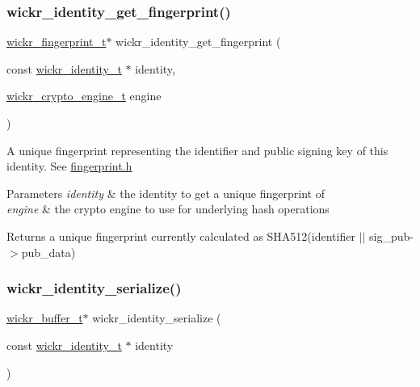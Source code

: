 \subsubsection{\texorpdfstring{wickr\_identity\_get\_fingerprint()}{wickr\_identity\_get\_fingerprint()}}
{\footnotesize\ttfamily \mbox{\hyperlink{structwickr__fingerprint}{wickr\+\_\+fingerprint\+\_\+t}}$\ast$ wickr\+\_\+identity\+\_\+get\+\_\+fingerprint (\begin{DoxyParamCaption}\item[{const \mbox{\hyperlink{structwickr__identity}{wickr\+\_\+identity\+\_\+t}} $\ast$}]{identity,  }\item[{\mbox{\hyperlink{structwickr__crypto__engine}{wickr\+\_\+crypto\+\_\+engine\+\_\+t}}}]{engine }\end{DoxyParamCaption})}

A unique fingerprint representing the identifier and public signing key of this identity. See \textquotesingle{}\mbox{\hyperlink{fingerprint_8h_source}{fingerprint.\+h}}\textquotesingle{}


\begin{DoxyParams}{Parameters}
{\em identity} & the identity to get a unique fingerprint of \\
\hline
{\em engine} & the crypto engine to use for underlying hash operations \\
\hline
\end{DoxyParams}
\begin{DoxyReturn}{Returns}
a unique fingerprint currently calculated as S\+H\+A512(identifier $\vert$$\vert$ sig\+\_\+pub-\/$>$pub\+\_\+data) 
\end{DoxyReturn}
\mbox{\label{group__wickr__identity_ga79ca0713d0b90873e584379f26cbd051}} 
\subsubsection{\texorpdfstring{wickr\_identity\_serialize()}{wickr\_identity\_serialize()}}
{\footnotesize\ttfamily \mbox{\hyperlink{structwickr__buffer}{wickr\+\_\+buffer\+\_\+t}}$\ast$ wickr\+\_\+identity\+\_\+serialize (\begin{DoxyParamCaption}\item[{const \mbox{\hyperlink{structwickr__identity}{wickr\+\_\+identity\+\_\+t}} $\ast$}]{identity }\end{DoxyParamCaption})}

